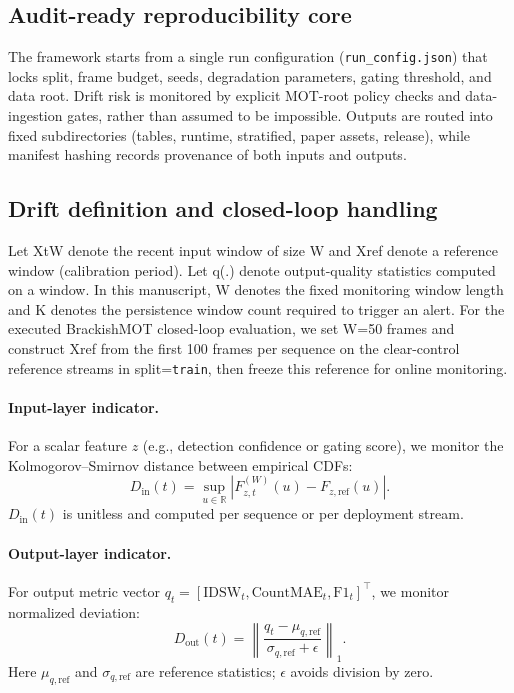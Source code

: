 \documentclass[5p,twocolumn,a4paper]{elsarticle}
\begin{document}
\subsection{Audit-ready reproducibility core}
The framework starts from a single run configuration (\texttt{run\_config.json}) that locks split, frame budget, seeds, degradation parameters, gating threshold, and data root. Drift risk is monitored by explicit MOT-root policy checks and data-ingestion gates, rather than assumed to be impossible. Outputs are routed into fixed subdirectories (tables, runtime, stratified, paper assets, release), while manifest hashing records provenance of both inputs and outputs.

\subsection{Drift definition and closed-loop handling}
Let XtW denote the recent input window of size W and Xref denote a reference window (calibration period). Let q(.) denote output-quality statistics computed on a window.
In this manuscript, W denotes the fixed monitoring window length and K denotes the persistence window count required to trigger an alert. For the executed BrackishMOT closed-loop evaluation, we set W=50 frames and construct Xref from the first 100 frames per sequence on the clear-control reference streams in split=\texttt{train}, then freeze this reference for online monitoring.

\paragraph{Input-layer indicator.}
For a scalar feature $z$ (e.g., detection confidence or gating score), we monitor the Kolmogorov--Smirnov distance between empirical \textsc{CDF}s:
\begin{equation}
D_{\mathrm{in}}(t)=\sup_{u \in \mathbb{R}}\left|F_{z,t}^{(W)}(u)-F_{z,\mathrm{ref}}(u)\right|.
\end{equation}
$D_{\mathrm{in}}(t)$ is unitless and computed per sequence or per deployment stream.

\paragraph{Output-layer indicator.}
For output metric vector $q_t=[\mathrm{IDSW}_t,\mathrm{CountMAE}_t,\mathrm{F1}_t]^\top$, we monitor normalized deviation:
\begin{equation}
D_{\mathrm{out}}(t)=\left\lVert \frac{q_t-\mu_{q,\mathrm{ref}}}{\sigma_{q,\mathrm{ref}}+\epsilon} \right\rVert_1.
\end{equation}
Here $\mu_{q,\mathrm{ref}}$ and $\sigma_{q,\mathrm{ref}}$ are reference statistics; $\epsilon$ avoids division by zero.
\end{document}
